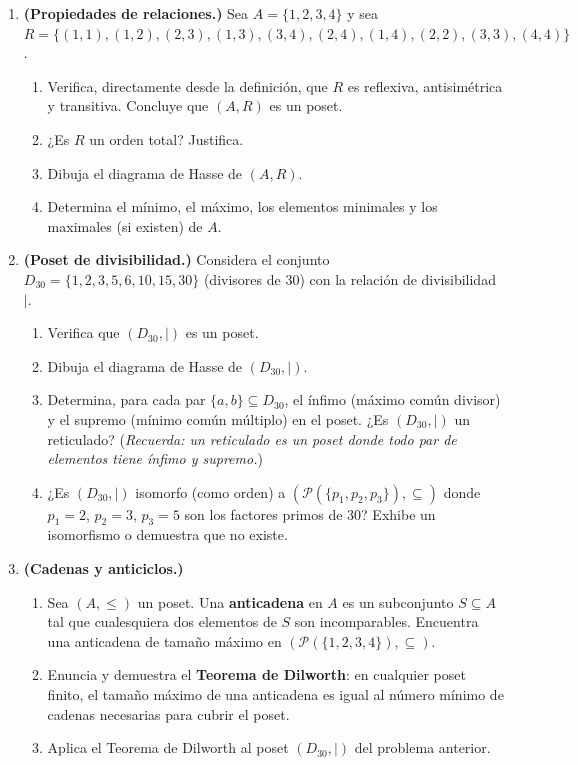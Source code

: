 \begin{enumerate}[leftmargin=2em, label=\textbf{\arabic*.}]

  \item \textbf{(Propiedades de relaciones.)}
  Sea $A = \{1, 2, 3, 4\}$ y sea $R = \{(1,1),(1,2),(2,3),(1,3),(3,4),(2,4),(1,4),(2,2),(3,3),(4,4)\}$.
  \begin{enumerate}[label=(\alph*)]
    \item Verifica, directamente desde la definición, que $R$ es reflexiva, antisimétrica y transitiva. Concluye que $(A, R)$ es un poset.
    \item ¿Es $R$ un orden total? Justifica.
    \item Dibuja el diagrama de Hasse de $(A, R)$.
    \item Determina el mínimo, el máximo, los elementos minimales y los maximales (si existen) de $A$.
  \end{enumerate}

  \item \textbf{(Poset de divisibilidad.)}
  Considera el conjunto $D_{30} = \{1, 2, 3, 5, 6, 10, 15, 30\}$ (divisores de $30$) con la relación de divisibilidad $\mid$.
  \begin{enumerate}[label=(\alph*)]
    \item Verifica que $(D_{30}, \mid)$ es un poset.
    \item Dibuja el diagrama de Hasse de $(D_{30}, \mid)$.
    \item Determina, para cada par $\{a,b\} \subseteq D_{30}$, el ínfimo (máximo común divisor) y el supremo (mínimo común múltiplo) en el poset. ¿Es $(D_{30}, \mid)$ un reticulado? (\emph{Recuerda: un reticulado es un poset donde todo par de elementos tiene ínfimo y supremo.})
    \item ¿Es $(D_{30}, \mid)$ isomorfo (como orden) a $(\mathcal{P}(\{p_1, p_2, p_3\}), \subseteq)$ donde $p_1 = 2$, $p_2 = 3$, $p_3 = 5$ son los factores primos de $30$? Exhibe un isomorfismo o demuestra que no existe.
  \end{enumerate}

  \item \textbf{(Cadenas y anticiclos.)}
  \begin{enumerate}[label=(\alph*)]
    \item Sea $(A, \leq)$ un poset. Una \textbf{anticadena} en $A$ es un subconjunto $S \subseteq A$ tal que cualesquiera dos elementos de $S$ son incomparables. Encuentra una anticadena de tamaño máximo en $(\mathcal{P}(\{1,2,3,4\}), \subseteq)$.
    \item Enuncia y demuestra el \textbf{Teorema de Dilworth}: en cualquier poset finito, el tamaño máximo de una anticadena es igual al número mínimo de cadenas necesarias para cubrir el poset.
    \item Aplica el Teorema de Dilworth al poset $(D_{30}, \mid)$ del problema anterior.
  \end{enumerate}


\end{enumerate}
